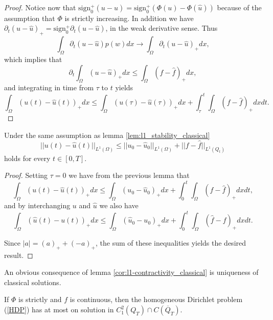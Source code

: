 \documentclass[11pt, a4paper]{article}
\begin{document}
\begin{proof}
Notice now that $\mathrm{sign}_0^+(u-\hat{u}) = \mathrm{sign}_0^+(\Phi(u) - \Phi(\hat{u}))$ because of the assumption that $\Phi$ is strictly increasing. In addition we have $\partial_t (u-\hat{u})_+ = \mathrm{sign}_0^+ \partial_t (u - \hat{u})$, in the weak derivative sense. Thus
\begin{equation*}
\int_\Omega \partial_t(u-\hat{u})p(w) dx \to \int_\Omega \partial_t (u-\hat{u})_+ dx,
\end{equation*}
which implies that
\begin{equation*}
\partial_t \int_{\Omega}(u-\hat{u})_+dx \leq \int_{\Omega}(f-\hat{f})_+ dx,
\end{equation*}
and integrating in time from $\tau$ to $t$ yields
\begin{equation*}
\int_{\Omega}(u(t)-\hat{u}(t))_+dx \leq \int_{\Omega}(u(\tau)-\hat{u}(\tau))_+dx + \int_\tau^t\int_{\Omega}(f-\hat{f})_+dxdt.
\end{equation*}
\end{proof}


\begin{cor}[$L^1$-contractivity]
\label{cor:l1-contractivity_classical}
Under the same assumption as lemma \ref{lem:l1_stability_classical}
\begin{equation}
\label{l1_contractivity}
||u(t) - \hat{u}(t)||_{L^1(\Omega)} \leq ||u_0 - \hat{u}_0||_{L^1(\Omega)} + ||f-\hat{f}||_{L^1(Q_t)}
\end{equation}
holds for every $t\in [0,T]$.
\end{cor}

\begin{proof}
Setting $\tau = 0$ we have from the previous lemma that
\begin{equation*}
\int_\Omega  (u(t)-\hat{u}(t))_+dx \leq \int_\Omega (u_0 - \hat{u}_0)_+dx + \int_0^t \int_\Omega (f-\hat{f})_+ dxdt,
\end{equation*}
and by interchanging $u$ and $\hat{u}$ we also have 
\begin{equation*}
\int_\Omega  (\hat{u}(t)-u(t))_+dx \leq \int_\Omega (\hat{u}_0 - u_0)_+dx + \int_0^t \int_\Omega (\hat{f}-f)_+ dxdt.
\end{equation*}

Since $|a| = (a)_+ + (-a)_+$, the sum of these inequalities yields the desired result.
\end{proof}
An obvious consequence of lemma \ref{cor:l1-contractivity_classical} is uniqueness of classical solutions.
\begin{cor}
If $\Phi$ is strictly and $f$ is continuous, then the homogeneous Dirichlet problem (\ref{HDP}) has at most on solution in $C^2_1(Q_T)\cap C(\overline{Q}_T)$.
\end{cor}
\end{document}
